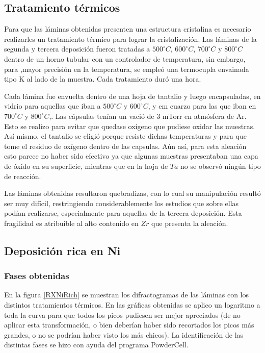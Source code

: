 \documentclass{article}
\theoremstyle{definition}
\theoremstyle{remark}
\begin{document}
\subsection{Tratamiento térmicos}
Para que las láminas obtenidas presenten una estructura cristalina es necesario realizarles un tratamiento térmico para lograr la cristalización. Las láminas de la segunda y tercera deposición fueron tratadas a $500 ^\circ C$, $600 ^\circ C$, $700 ^\circ C$ y $800 ^\circ C$ dentro de un horno tubular con un controlador de temperatura, sin embargo, para ,mayor precisión en la temperatura, se empleó una termocupla envainada tipo K al lado de la muestra. Cada tratamiento duró una hora.

Cada lámina fue envuelta dentro de una hoja de tantalio y luego encapsuladas, en vidrio para aquellas que iban a $500 ^\circ C$ y $600 ^\circ C$, y em cuarzo para las que iban en $700 ^\circ C$ y $800 ^\circ C$,. Las cápsulas tenían un vació de 3 mTorr en atmósfera de Ar. Esto se realizo para evitar que quedase oxígeno que pudiese oxidar las muestras. Así mismo, el tantalio se eligió porque resiste dichas temperaturas y para que tome el residuo de oxígeno dentro de las capsulas. Aún así, para esta aleación esto parece no haber sido efectivo ya que algunas muestras presentaban una capa de óxido en su superficie, mientras que en la hoja de $Ta$ no se observó ningún tipo de reacción.

Las láminas obtenidas resultaron quebradizas, con lo cual su manipulación resultó ser muy difícil, restringiendo considerablemente los estudios que sobre ellas podían realizarse, especialmente para aquellas de la tercera deposición. Esta fragilidad es atribuible al alto contenido en $Zr$ que presenta la aleación. 

\subsection{Deposición rica en Ni}
\subsubsection{Fases obtenidas}
En la figura \ref{RXNiRich} se muestran los difractogramas de las láminas con los distintos tratamientos térmicos. En las gráficas obtenidas se aplico un logaritmo a toda la curva para que todos los picos pudiesen ser mejor apreciados (de no aplicar esta transformación, o bien deberían haber sido recortados los picos más grandes, o no se podrían haber visto los más chicos). La identificación de las distintas fases se hizo con ayuda del programa PowderCell.
\end{document}
